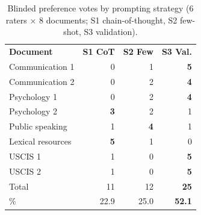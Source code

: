\begin{table}[t]
    
  \begin{tabular}{lrrr}
    
    \textbf{Document} & \textbf{S1 CoT} & \textbf{S2 Few} & \textbf{S3 Val.} \\
    
    Communication 1   & 0 & 1 & \textbf{5} \\
    Communication 2   & 0 & 2 & \textbf{4} \\
    Psychology 1      & 0 & 2 & \textbf{4} \\
    Psychology 2      & \textbf{3} & 2 & 1 \\
    Public speaking   & 1 & \textbf{4} & 1 \\
    Lexical resources & \textbf{5} & 1 & 0 \\
    USCIS 1           & 1 & 0 & \textbf{5} \\
    USCIS 2           & 1 & 0 & \textbf{5} \\
    
    Total             & 11 & 12 & \textbf{25} \\
    \%                & 22.9 & 25.0 & \textbf{52.1} \\
    
  \end{tabular}
  \caption{Blinded preference votes by prompting strategy (6 raters
           $\times$ 8 documents; S1 chain-of-thought, S2 few-shot,
           S3 validation).}
  \label{tab:strategy}
\end{table}